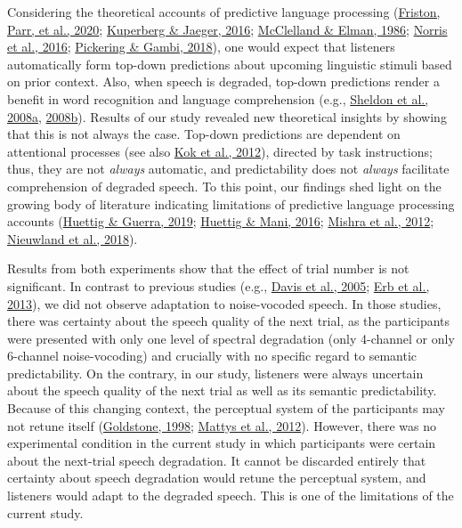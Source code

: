 \documentclass[a4paper, nobind]{templates/ociamthesis}
\begin{document}
Considering the theoretical accounts of predictive language processing (\protect\hyperlink{ref-Friston2020}{Friston, Parr, et al., 2020}; \protect\hyperlink{ref-Kuperberg2016}{Kuperberg \& Jaeger, 2016}; \protect\hyperlink{ref-Mcclelland1986}{McClelland \& Elman, 1986}; \protect\hyperlink{ref-Norris2016}{Norris et al., 2016}; \protect\hyperlink{ref-Pickering2018}{Pickering \& Gambi, 2018}), one would expect that listeners automatically form top-down predictions about upcoming linguistic stimuli based on prior context.
Also, when speech is degraded, top-down predictions render a benefit in word recognition and language comprehension (e.g., \protect\hyperlink{ref-Sheldon2008a}{Sheldon et al., 2008a}, \protect\hyperlink{ref-Sheldon2008b}{2008b}).
Results of our study revealed new theoretical insights by showing that this is not always the case.
Top-down predictions are dependent on attentional processes (see also \protect\hyperlink{ref-Kok2012}{Kok et al., 2012}), directed by task instructions;
thus, they are not \emph{always} automatic, and predictability does not \emph{always} facilitate comprehension of degraded speech.
To this point, our findings shed light on the growing body of literature indicating limitations of predictive language processing accounts (\protect\hyperlink{ref-Huettig2019}{Huettig \& Guerra, 2019}; \protect\hyperlink{ref-Huettig2016}{Huettig \& Mani, 2016}; \protect\hyperlink{ref-Mishra2012}{Mishra et al., 2012}; \protect\hyperlink{ref-Nieuwland2018}{Nieuwland et al., 2018}).

Results from both experiments show that the effect of trial number is not significant.
In contrast to previous studies (e.g., \protect\hyperlink{ref-Davis2005}{Davis et al., 2005}; \protect\hyperlink{ref-Erb2013}{Erb et al., 2013}), we did not observe adaptation to noise-vocoded speech.
In those studies, there was certainty about the speech quality of the next trial, as the participants were presented with only one level of spectral degradation (only 4-channel or only 6-channel noise-vocoding)
and crucially with no specific regard to semantic predictability.
On the contrary, in our study, listeners were always uncertain about the speech quality of the next trial as well as its semantic predictability.
Because of this changing context, the perceptual system of the participants may not retune itself (\protect\hyperlink{ref-Goldstone1998}{Goldstone, 1998}; \protect\hyperlink{ref-Mattys2012}{Mattys et al., 2012}).
However, there was no experimental condition in the current study in which participants were certain about the next-trial speech degradation.
It cannot be discarded entirely that certainty about speech degradation would retune the perceptual system,
and listeners would adapt to the degraded speech.
This is one of the limitations of the current study.
\end{document}
